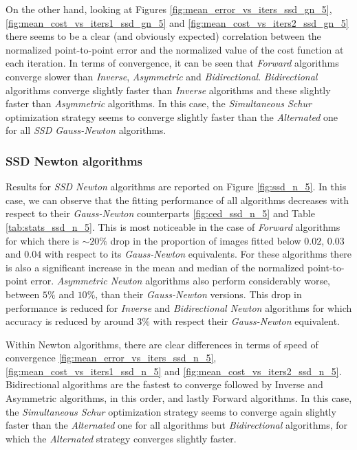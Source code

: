 On the other hand, looking at Figures \ref{fig:mean_error_vs_iters_ssd_gn_5}, \ref{fig:mean_cost_vs_iters1_ssd_gn_5} and \ref{fig:mean_cost_vs_iters2_ssd_gn_5} there seems to be a clear (and obviously expected) correlation between the normalized point-to-point error and the normalized value of the cost function at each iteration. In terms of convergence, it can be seen that \emph{Forward} algorithms converge slower than \emph{Inverse}, \emph{Asymmetric} and \emph{Bidirectional}. \emph{Bidirectional} algorithms converge slightly faster than \emph{Inverse} algorithms and these slightly faster than \emph{Asymmetric} algorithms. In this case, the \emph{Simultaneous Schur} optimization strategy seems to converge slightly faster than the \emph{Alternated} one for all \emph{SSD Gauss-Newton} algorithms.


\subsubsection{SSD Newton algorithms}

Results for \emph{SSD Newton} algorithms are reported on Figure \ref{fig:ssd_n_5}. In this case, we can observe that the fitting performance of all algorithms decreases with respect to their \emph{Gauss-Newton} counterparts \ref{fig:ced_ssd_n_5} and Table \ref{tab:stats_ssd_n_5}. This is most noticeable in the case of \emph{Forward} algorithms for which there is $\sim20\%$ drop in the proportion of images fitted below $0.02$, $0.03$ and $0.04$ with respect to its \emph{Gauss-Newton} equivalents. For these algorithms there is also a significant increase in the mean and median of the normalized point-to-point error. \emph{Asymmetric Newton} algorithms also perform considerably worse, between $5\%$ and $10\%$, than their \emph{Gauss-Newton} versions. This drop in performance is reduced for \emph{Inverse} and \emph{Bidirectional Newton} algorithms for which accuracy is reduced by around $3\%$ with respect their \emph{Gauss-Newton} equivalent. 

Within Newton algorithms, there are clear differences in terms of speed of convergence \ref{fig:mean_error_vs_iters_ssd_n_5}, \ref{fig:mean_cost_vs_iters1_ssd_n_5} and \ref{fig:mean_cost_vs_iters2_ssd_n_5}. Bidirectional algorithms are the fastest to converge followed by Inverse and Asymmetric algorithms, in this order, and lastly Forward algorithms. In this case, the \emph{Simultaneous Schur} optimization strategy seems to converge again slightly faster than the \emph{Alternated} one for all algorithms but \emph{Bidirectional} algorithms, for which the \emph{Alternated} strategy converges slightly faster.

